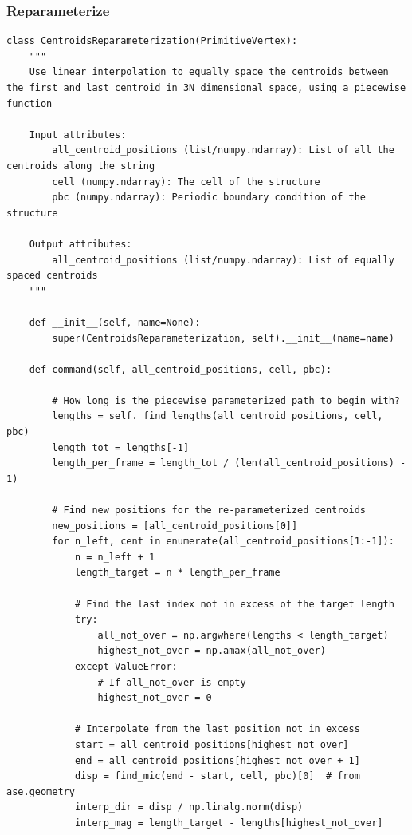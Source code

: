 \documentclass{article}
\begin{document}
{\subsubsection{Reparameterize}

\begin{lstlisting}
class CentroidsReparameterization(PrimitiveVertex):
    """
    Use linear interpolation to equally space the centroids between the first and last centroid in 3N dimensional space, using a piecewise function

    Input attributes:
        all_centroid_positions (list/numpy.ndarray): List of all the centroids along the string
        cell (numpy.ndarray): The cell of the structure
        pbc (numpy.ndarray): Periodic boundary condition of the structure

    Output attributes:
        all_centroid_positions (list/numpy.ndarray): List of equally spaced centroids
    """

    def __init__(self, name=None):
        super(CentroidsReparameterization, self).__init__(name=name)

    def command(self, all_centroid_positions, cell, pbc):

        # How long is the piecewise parameterized path to begin with?
        lengths = self._find_lengths(all_centroid_positions, cell, pbc)
        length_tot = lengths[-1]
        length_per_frame = length_tot / (len(all_centroid_positions) - 1)

        # Find new positions for the re-parameterized centroids
        new_positions = [all_centroid_positions[0]]
        for n_left, cent in enumerate(all_centroid_positions[1:-1]):
            n = n_left + 1
            length_target = n * length_per_frame

            # Find the last index not in excess of the target length
            try:
                all_not_over = np.argwhere(lengths < length_target)
                highest_not_over = np.amax(all_not_over)
            except ValueError:
                # If all_not_over is empty
                highest_not_over = 0

            # Interpolate from the last position not in excess
            start = all_centroid_positions[highest_not_over]
            end = all_centroid_positions[highest_not_over + 1]
            disp = find_mic(end - start, cell, pbc)[0]  # from ase.geometry
            interp_dir = disp / np.linalg.norm(disp)
            interp_mag = length_target - lengths[highest_not_over]


\end{lstlisting}}
\end{document}
